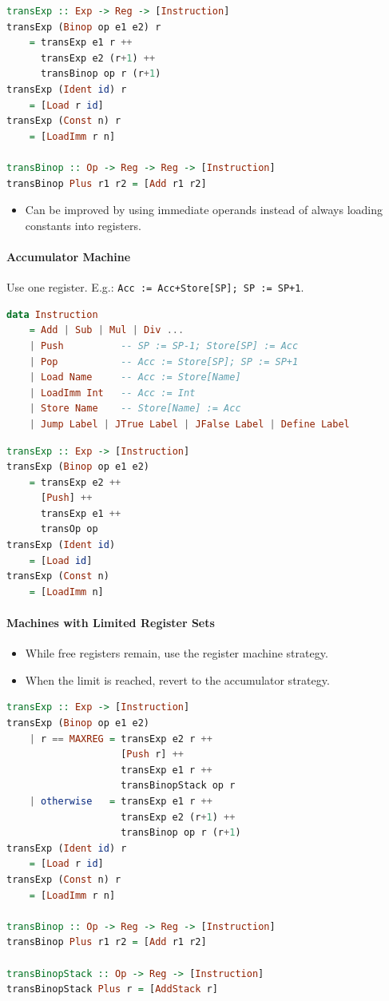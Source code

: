 \documentclass[twocolumn,english]{article}
\let\emph\relax
\begin{document}
\begin{lstlisting}[language=Haskell,tabsize=2]
transExp :: Exp -> Reg -> [Instruction]
transExp (Binop op e1 e2) r
	= transExp e1 r ++
	  transExp e2 (r+1) ++
	  transBinop op r (r+1)
transExp (Ident id) r
	= [Load r id]
transExp (Const n) r
	= [LoadImm r n]

transBinop :: Op -> Reg -> Reg -> [Instruction]
transBinop Plus r1 r2 = [Add r1 r2]
\end{lstlisting}
\begin{itemize}
\item Can be improved by using immediate operands instead of always loading
constants into registers. 
\end{itemize}

\paragraph{Accumulator Machine}

Use one register. E.g.\texttt{\emph{ Add}}: \texttt{Acc := Acc+Store{[}SP{]};
SP := SP+1}.
\begin{lstlisting}[language=Haskell,tabsize=2]
data Instruction
	= Add | Sub | Mul | Div ...
	| Push          -- SP := SP-1; Store[SP] := Acc
	| Pop           -- Acc := Store[SP]; SP := SP+1
	| Load Name     -- Acc := Store[Name]
	| LoadImm Int   -- Acc := Int
	| Store Name    -- Store[Name] := Acc
	| Jump Label | JTrue Label | JFalse Label | Define Label
\end{lstlisting}
\begin{lstlisting}[language=Haskell,tabsize=2]
transExp :: Exp -> [Instruction]
transExp (Binop op e1 e2)
	= transExp e2 ++
	  [Push] ++
	  transExp e1 ++
	  transOp op
transExp (Ident id)
	= [Load id]
transExp (Const n)
	= [LoadImm n]
\end{lstlisting}

\paragraph{Machines with Limited Register Sets}
\begin{itemize}
\item While free registers remain, use the register machine strategy. 
\item When the limit is reached, revert to the accumulator strategy. 
\end{itemize}
\begin{lstlisting}[language=Haskell,tabsize=2]
transExp :: Exp -> [Instruction]
transExp (Binop op e1 e2)
	| r == MAXREG = transExp e2 r ++
	                [Push r] ++
	                transExp e1 r ++
	                transBinopStack op r
	| otherwise   = transExp e1 r ++
	                transExp e2 (r+1) ++
	                transBinop op r (r+1)
transExp (Ident id) r
	= [Load r id]
transExp (Const n) r
	= [LoadImm r n]

transBinop :: Op -> Reg -> Reg -> [Instruction]
transBinop Plus r1 r2 = [Add r1 r2]

transBinopStack :: Op -> Reg -> [Instruction]
transBinopStack Plus r = [AddStack r]
\end{lstlisting}
\end{document}
